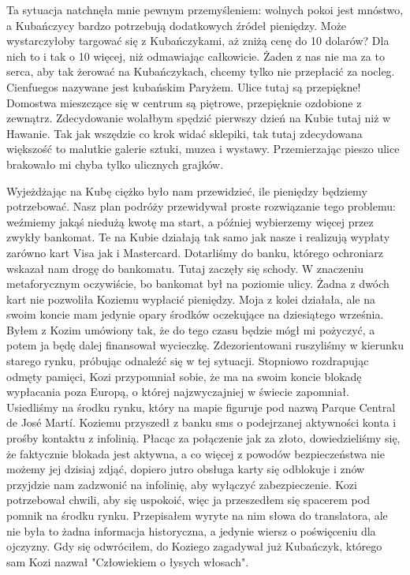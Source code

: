 Ta sytuacja natchnęła mnie pewnym przemyśleniem: wolnych pokoi jest mnóstwo, a Kubańczycy bardzo potrzebują dodatkowych źródeł pieniędzy.
Może wystarczyłoby targować się z Kubańczykami, aż zniżą cenę do 10 dolarów?
Dla nich to i tak o 10 więcej, niż odmawiając całkowicie.
Żaden z nas nie ma za to serca, aby tak żerować na Kubańczykach, chcemy tylko nie przepłacić za nocleg. 
Cienfuegos nazywane jest kubańskim Paryżem.
Ulice tutaj są przepiękne!
Domostwa mieszczące się w centrum są piętrowe, przepięknie ozdobione z zewnątrz.
Zdecydowanie wolałbym spędzić pierwszy dzień na Kubie tutaj niż w Hawanie.
Tak jak wszędzie co krok widać sklepiki, tak tutaj zdecydowana większość to malutkie galerie sztuki, muzea i wystawy.
Przemierzając pieszo ulice brakowało mi chyba tylko ulicznych grajków.
\par Wyjeżdżając na Kubę ciężko było nam przewidzieć, ile pieniędzy będziemy potrzebować.
Nasz plan podróży przewidywał proste rozwiązanie tego problemu: weźmiemy jakąś niedużą kwotę ma start, a później wybierzemy więcej przez zwykły bankomat.
Te na Kubie działają tak samo jak nasze i realizują wypłaty zarówno kart Visa jak i Mastercard.
Dotarliśmy do banku, którego ochroniarz wskazał nam drogę do bankomatu.
Tutaj zaczęły się schody.
W znaczeniu metaforycznym oczywiście, bo bankomat był na poziomie ulicy.
Żadna z dwóch kart nie pozwoliła Koziemu wypłacić pieniędzy.
Moja z kolei działała, ale na swoim koncie mam jedynie opary środków oczekujące na dziesiątego września.
Byłem z Kozim umówiony tak, że do tego czasu będzie mógł mi pożyczyć, a potem ja będę dalej finansował wycieczkę.
Zdezorientowani ruszyliśmy w kierunku starego rynku, próbując odnaleźć się w tej sytuacji.
Stopniowo rozdrapując odmęty pamięci, Kozi przypomniał sobie, że ma na swoim koncie blokadę wypłacania poza Europą, o której najzwyczajniej w świecie zapomniał.
Usiedliśmy na środku rynku, który na mapie figuruje pod nazwą Parque Central de José Martí.
Koziemu przyszedł z banku sms o podejrzanej aktywności konta i prośby kontaktu z infolinią.
Płacąc za połączenie jak za złoto, dowiedzieliśmy się, że faktycznie blokada jest aktywna, a co więcej z powodów bezpieczeństwa nie możemy jej dzisiaj zdjąć, dopiero jutro obsługa karty się odblokuje i znów przyjdzie nam zadzwonić na infolinię, aby wyłączyć zabezpieczenie.
Kozi potrzebował chwili, aby się uspokoić, więc ja przeszedłem się spacerem pod pomnik na środku rynku.
Przepisałem wyryte na nim słowa do translatora, ale nie była to żadna informacja historyczna, a jedynie wiersz o poświęceniu dla ojczyzny.
Gdy się odwróciłem, do Koziego zagadywał już Kubańczyk, którego sam Kozi nazwał "Człowiekiem o łysych włosach".
